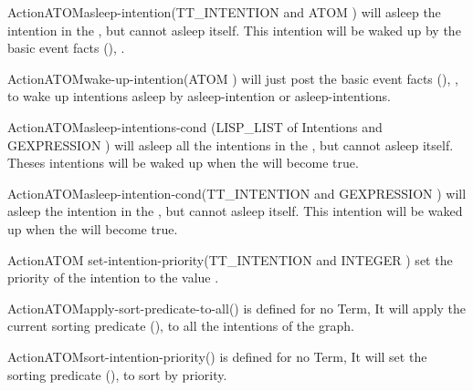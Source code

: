 \begin{typeefa}{Action}{ATOM}{asleep-intention}{(TT\_INTENTION and ATOM )}
will asleep the intention in the , but cannot asleep itself.
This intention will be waked up by the basic event facts (),  .
\end{typeefa}

\begin{typeefa}{Action}{ATOM}{wake-up-intention}{(ATOM )}
will just post the basic event facts (),
, to wake up intentions
asleep by asleep-intention or asleep-intentions.
\end{typeefa}

\begin{typeefa}{Action}{ATOM}{asleep-intentions-cond}
{(LISP\_LIST of Intentions and GEXPRESSION )}
will asleep all the intentions in the , but cannot asleep itself.
Theses intentions will be waked up when the  will become true.
\end{typeefa}

\begin{typeefa}{Action}{ATOM}{asleep-intention-cond}{(TT\_INTENTION and
GEXPRESSION )}
will asleep the intention in the , but cannot asleep itself.
This intention will be waked up when the  will become true.
\end{typeefa}

\begin{typeefa}{Action}{ATOM} {set-intention-priority}{(TT\_INTENTION and
INTEGER )}
set  the priority of the intention to the value .
\end{typeefa}

\begin{typeefa}{Action}{ATOM}{apply-sort-predicate-to-all}{()}
is defined for no Term, It will apply the current sorting predicate
(), to all the intentions of the
graph. 
\end{typeefa}

\begin{typeefa}{Action}{ATOM}{sort-intention-priority}{()}
is defined for no Term, It will set the sorting predicate (), to sort by priority. 
\end{typeefa}

